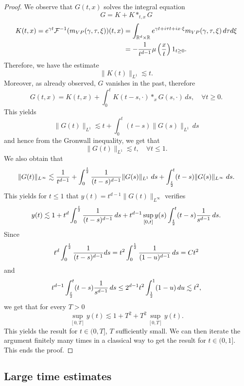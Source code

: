 \documentclass[11pt]{amsart}
\numberwithin{equation}{section}
\begin{document}
\begin{proof}
We observe that $ G(t,x)$ solves the integral equation
$$   G=  K  + K *_{t,x}  G$$
\begin{align*} K(t,x)= e^{\gamma t} \mathcal{F}^{-1}( m_{VP}(\gamma, \tau, \xi) ) (t,x) & = \int_{\mathbb{R}^d \times \mathbb{R}}
 e^{ \gamma t  + i \tau t  + i x \cdot \xi} m_{VP}(\gamma, \tau, \xi)\, d\tau d\xi \\
 &  = - { 1 \over t^{d-1}} \mu\left(  { x \over t} \right)
  \mathrm{1}_{t \geq 0}.
  \end{align*}
  Therefore,  we have the estimate
  $$ \|K(t)\|_{L^1} \lesssim t.$$
  Moreover, as already observed, $G$ vanishes in the past, therefore
  $$ G(t,x) =  K(t,x) + \int_{0}^t K(t-s, \cdot)*_{x} G(s, \cdot) \, ds, \quad  \forall t \geq 0.$$
   This yields
   $$ \|G(t) \|_{L^1} \lesssim  t +  \int_{0}^t (t-s)  \|G(s)\|_{L^1}\, ds$$ and hence from the Gronwall
   inequality, we get that
   $$ \|G(t) \|_{L^1} \lesssim t, \quad \forall t \leq 1.$$  
  We also obtain  that
   $$ \|G(t) \|_{L^\infty} \lesssim { 1 \over t^{d-1}} + \int_{0}^{{t\over 2} } { 1 \over (t-s)^{d-1}} \|G(s) \|_{L^1} \; ds+ \int_{t\over 2}^t
     (t-s) \|G(s) \|_{L^\infty} \; ds.$$
    This yields for $t \leq 1$ that $y(t)= t^{d-1} \|G(t)\|_{L^\infty}$ verifies
    $$ y(t) \lesssim 1 +  t^{d} \int_{0}^{t\over 2} { 1 \over (t-s)^{d-1}} \, ds + t^{d-1}  \sup_{[0, t]} y(s) 
     \int_{t\over2}^t  (t-s)  { 1 \over s^{d-1}} \, ds.$$
     Since 
     $$  t^{d} \int_{0}^{t\over 2} { 1 \over (t-s)^{d-1}} ds = t^2 \int_{0}^{ 1 \over 2} { 1 \over (1- u)^{d-1}} \, ds = Ct^2$$
      and 
      $$    t^{d-1}    \int_{t\over2}^t  (t-s)  { 1 \over s^{d-1}} \, ds \leq  2^{d-1} t^2 \int_{{1 \over 2}}^1 (1-u)\, du \lesssim  t^2, $$
      we get that for every $T >0$
      $$ \sup_{[0, T]} y(t) \lesssim 1 + T^2 + T^2   \sup_{[0, T]} y(t).$$
       This yields the result for $t\in (0, T]$, $T$  sufficiently small. We can then iterate the argument finitely many times in a classical way  to get the result for $t \in (0, 1].$
       This ends the proof.
   \end{proof}
   
   \subsection{Large time estimates}
   
\end{document}
